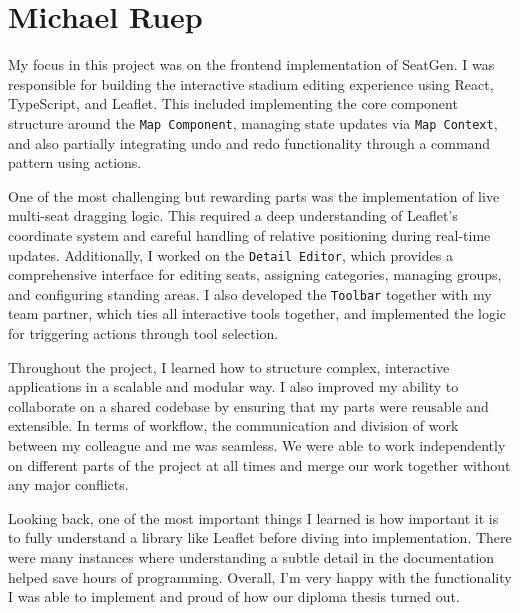 \section{Michael Ruep}

My focus in this project was on the frontend implementation of SeatGen. I was responsible for building the interactive stadium editing experience using React, TypeScript, and Leaflet. This included implementing the core component structure around the \texttt{Map Component}, managing state updates via \texttt{Map Context}, and also partially integrating undo and redo functionality through a command pattern using actions.

One of the most challenging but rewarding parts was the implementation of live multi-seat dragging logic. This required a deep understanding of Leaflet’s coordinate system and careful handling of relative positioning during real-time updates. Additionally, I worked on the \texttt{Detail Editor}, which provides a comprehensive interface for editing seats, assigning categories, managing groups, and configuring standing areas. I also developed the \texttt{Toolbar} together with my team partner, which ties all interactive tools together, and implemented the logic for triggering actions through tool selection.

Throughout the project, I learned how to structure complex, interactive applications in a scalable and modular way. I also improved my ability to collaborate on a shared codebase by ensuring that my parts were reusable and extensible. In terms of workflow, the communication and division of work between my colleague and me was seamless. We were able to work independently on different parts of the project at all times and merge our work together without any major conflicts.

Looking back, one of the most important things I learned is how important it is to fully understand a library like Leaflet before diving into implementation. There were many instances where understanding a subtle detail in the documentation helped save hours of programming. Overall, I’m very happy with the functionality I was able to implement and proud of how our diploma thesis turned out.

